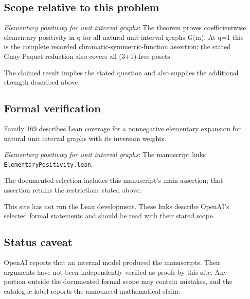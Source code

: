 \documentclass[11pt]{article}
\begin{document}
\subsection{Scope relative to this problem}
\textit{Elementary positivity for unit interval graphs}: The theorem proves coefficientwise elementary positivity in q for all natural unit interval graphs G(m). At q=1 this is the complete recorded chromatic-symmetric-function assertion; the stated Guay-Paquet reduction also covers all (3+1)-free posets.

The claimed result implies the stated question and also supplies the additional strength described above.

\subsection{Formal verification}
Family 169 describes Lean coverage for a nonnegative elementary expansion for natural unit interval graphs with its inversion weights.

\textit{Elementary positivity for unit interval graphs}: The manuscript links \texttt{ElementaryPositivity.lean}.

The documented selection includes this manuscript’s main assertion; that assertion retains the restrictions stated above.

This site has not run the Lean development. These links describe OpenAI’s selected formal statements and should be read with their stated scope.

\subsection{Status caveat}
OpenAI reports that an internal model produced the manuscripts. Their arguments have not been independently verified as proofs by this site. Any portion outside the documented formal scope may contain mistakes, and the catalogue label reports the announced mathematical claim.
\end{document}
